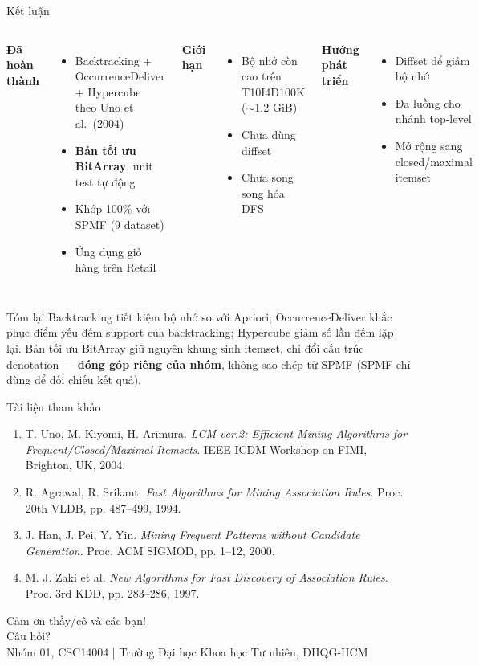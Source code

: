 \documentclass[9pt, aspectratio=169]{beamer}
\newcommand{\opt}[1]{\textcolor{optgreen}{\textbf{#1}}}
\begin{document}
\begin{frame}{Kết luận}
  \begin{columns}[T]
    \small\textbf{Đã hoàn thành}
    \begin{itemize}
      \item Backtracking + OccurrenceDeliver + Hypercube theo Uno et al.\ (2004)
      \item \opt{Bản tối ưu BitArray}, unit test tự động
      \item Khớp 100\% với SPMF (9 dataset)
      \item Ứng dụng giỏ hàng trên Retail
    \end{itemize}
    \small\textbf{Giới hạn}
    \begin{itemize}
      \item Bộ nhớ còn cao trên T10I4D100K ($\sim$1.2 GiB)
      \item Chưa dùng diffset
      \item Chưa song song hóa DFS
    \end{itemize}
    \small\textbf{Hướng phát triển}
    \begin{itemize}
      \item Diffset để giảm bộ nhớ
      \item Đa luồng cho nhánh top-level
      \item Mở rộng sang closed/maximal itemset
    \end{itemize}
  \end{columns}
  \vspace{0.4em}
  \begin{alertblock}{Tóm lại}
    Backtracking tiết kiệm bộ nhớ so với Apriori; OccurrenceDeliver khắc
    phục điểm yếu đếm support của backtracking; Hypercube giảm số lần đếm
    lặp lại. Bản tối ưu BitArray giữ nguyên khung sinh itemset, chỉ đổi
    cấu trúc denotation — \opt{đóng góp riêng của nhóm}, không sao chép từ
    SPMF (SPMF chỉ dùng để đối chiếu kết quả).
  \end{alertblock}
\end{frame}

\begin{frame}{Tài liệu tham khảo}
  \footnotesize
  \begin{enumerate}
    \item T. Uno, M. Kiyomi, H. Arimura. \textit{LCM ver.2: Efficient Mining
      Algorithms for Frequent/Closed/Maximal Itemsets}. IEEE ICDM Workshop on
      FIMI, Brighton, UK, 2004.
    \item R. Agrawal, R. Srikant. \textit{Fast Algorithms for Mining
      Association Rules}. Proc. 20th VLDB, pp. 487--499, 1994.
    \item J. Han, J. Pei, Y. Yin. \textit{Mining Frequent Patterns without
      Candidate Generation}. Proc. ACM SIGMOD, pp. 1--12, 2000.
    \item M. J. Zaki et al. \textit{New Algorithms for Fast Discovery of
      Association Rules}. Proc. 3rd KDD, pp. 283--286, 1997.
  \end{enumerate}
\end{frame}

\begin{frame}[standout]
  \centering
  \Large Cảm ơn thầy/cô và các bạn!\\[0.8em]
  \normalsize Câu hỏi?\\[1.5em]
  \footnotesize Nhóm 01, CSC14004 \quad|\quad
  Trường Đại học Khoa học Tự nhiên, ĐHQG-HCM
\end{frame}
\end{document}
